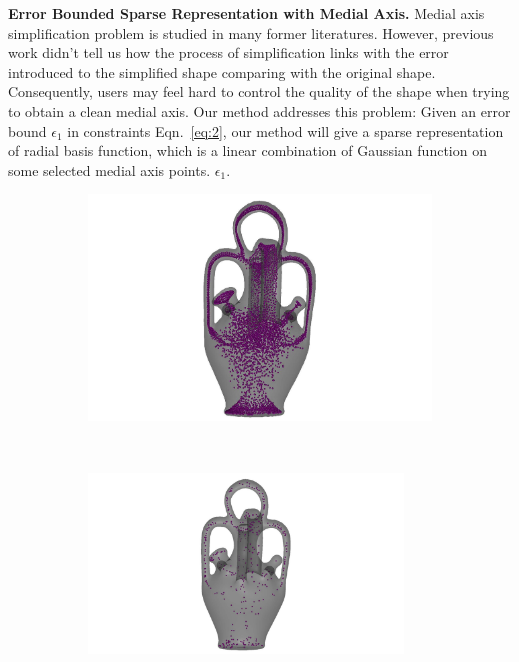 \documentclass[review]{acmsiggraph}
\begin{document}
\textbf{Error Bounded Sparse Representation with Medial Axis. }
Medial axis simplification problem is studied in many former literatures. However, previous work didn't tell us how the process of simplification links with the error introduced to the simplified shape comparing with the original shape. Consequently, users may feel hard to control the quality of the shape when trying to obtain a clean medial axis. Our method addresses this problem: Given an error bound $\epsilon_1$ in constraints Eqn.~\ref{eq:2}, our method will give a sparse representation of radial basis function, which is a linear combination of Gaussian function on some selected medial axis points. $\epsilon_1$. 
\begin{figure}
        \centering
		\begin{subfigure}[b]{0.24\linewidth}
                \centering
                \includegraphics[width=\textwidth]{images/vase/0.pdf}
       \end{subfigure}
		~
		\begin{subfigure}[b]{0.24\linewidth}
                \centering
                \includegraphics[width=0.92\textwidth]{images/vase/2.pdf}

\end{subfigure}
\end{figure}
\end{document}
